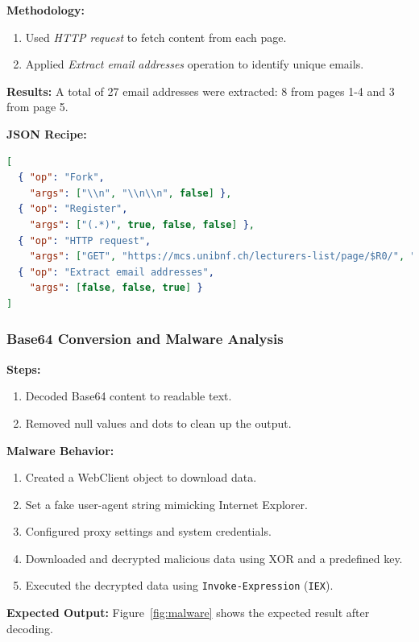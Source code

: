 \textbf{Methodology:}
\begin{enumerate}
    \item Used \emph{HTTP request} to fetch content from each page.
    \item Applied \emph{Extract email addresses} operation to identify unique emails.
\end{enumerate}

\textbf{Results:} A total of 27 email addresses were extracted: 8 from pages 1-4 and 3 from page 5.

\textbf{JSON Recipe:}
\begin{lstlisting}[language=json,caption=HTTP Request and Email Extraction Recipe]
[
  { "op": "Fork",
    "args": ["\\n", "\\n\\n", false] },
  { "op": "Register",
    "args": ["(.*)", true, false, false] },
  { "op": "HTTP request",
    "args": ["GET", "https://mcs.unibnf.ch/lecturers-list/page/$R0/", "", "Cross-Origin Resource Sharing", false] },
  { "op": "Extract email addresses",
    "args": [false, false, true] }
]
\end{lstlisting}

\subsubsection{Base64 Conversion and Malware Analysis}
\textbf{Steps:}
\begin{enumerate}
    \item Decoded Base64 content to readable text.
    \item Removed null values and dots to clean up the output.
\end{enumerate}

\textbf{Malware Behavior:}
\begin{enumerate}
    \item Created a WebClient object to download data.
    \item Set a fake user-agent string mimicking Internet Explorer.
    \item Configured proxy settings and system credentials.
    \item Downloaded and decrypted malicious data using XOR and a predefined key.
    \item Executed the decrypted data using \texttt{Invoke-Expression} (\texttt{IEX}).
\end{enumerate}

\textbf{Expected Output:} Figure~\ref{fig:malware} shows the expected result after decoding.

